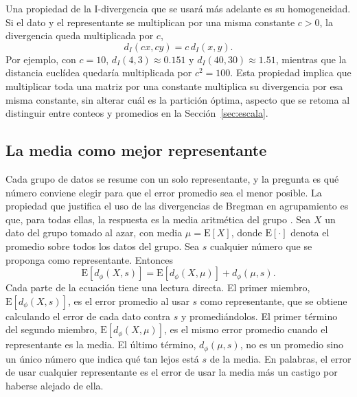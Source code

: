 Una propiedad de la I-divergencia que se usará más adelante es su homogeneidad.
Si el dato y el representante se multiplican por una misma constante $c > 0$, la
divergencia queda multiplicada por $c$,
\begin{equation}\label{eq:homogeneidad}
  d_I(cx, cy) = c \, d_I(x, y).
\end{equation}
Por ejemplo, con $c = 10$, $d_I(4, 3) \approx 0.151$ y $d_I(40, 30) \approx 1.51$,
mientras que la distancia euclídea quedaría multiplicada por $c^2 = 100$.
Esta propiedad implica que multiplicar toda una matriz por una constante
multiplica su divergencia por esa misma constante, sin alterar cuál es la
partición óptima, aspecto que se retoma al distinguir entre conteos y promedios
en la Sección~\ref{sec:escala}.

\subsection{La media como mejor representante}

Cada grupo de datos se resume con un solo representante, y la pregunta es qué
número conviene elegir para que el error promedio sea el menor posible. La
propiedad que justifica el uso de las divergencias de Bregman en agrupamiento
es que, para todas ellas, la respuesta es la media aritmética del grupo
\citep[Prop.~1]{Banerjee2005}.
Sea $X$ un dato del grupo tomado al azar, con media $\mu = \mathrm{E}[X]$, donde
$\mathrm{E}[\cdot]$ denota el promedio sobre todos los datos del grupo. Sea $s$
cualquier número que se proponga como representante. Entonces
\begin{equation}\label{eq:media}
  \mathrm{E}[d_\phi(X, s)] = \mathrm{E}[d_\phi(X, \mu)] + d_\phi(\mu, s).
\end{equation}
Cada parte de la ecuación tiene una lectura directa. El primer miembro,
$\mathrm{E}[d_\phi(X, s)]$, es el error promedio al usar $s$ como representante,
que se obtiene calculando el error de cada dato contra $s$ y promediándolos. El
primer término del segundo miembro, $\mathrm{E}[d_\phi(X, \mu)]$, es el mismo
error promedio cuando el representante es la media. El último término,
$d_\phi(\mu, s)$, no es un promedio sino un único número que indica qué tan lejos
está $s$ de la media. En palabras,
el error de usar cualquier representante es el error de usar la media más un
castigo por haberse alejado de ella.

